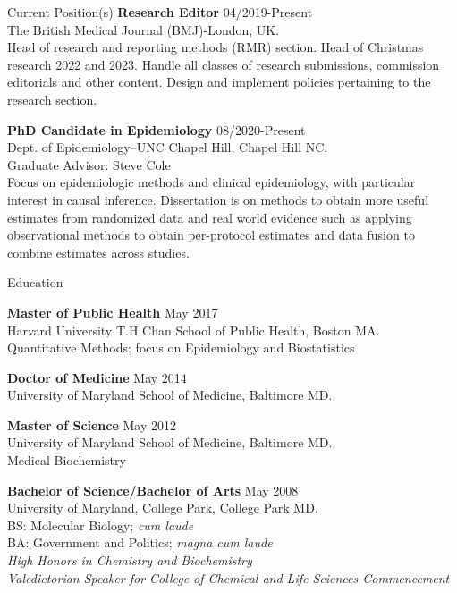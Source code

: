 \documentclass{resume} %
\begin{document}
\begin{rSection}{Current Position(s)}
   {\textbf{Research Editor} } \hfill {04/2019-Present}
   \\ 
   The British Medical Journal (BMJ)-London, UK. 
   \\
    Head of research and reporting methods (RMR) section. Head of Christmas research 2022 and 2023. Handle all classes of research submissions, commission editorials and other content. Design and implement policies pertaining to the research section. 
   
   {\textbf{PhD Candidate in Epidemiology}} \hfill {08/2020-Present}
   \\ 
   Dept. of Epidemiology--UNC Chapel Hill, Chapel Hill NC. 
   \\
   Graduate Advisor: Steve Cole\\
   Focus on epidemiologic methods and clinical epidemiology, with particular interest in causal inference. Dissertation is on methods to obtain more useful estimates from randomized data and real world evidence such as applying observational methods to obtain per-protocol estimates and data fusion to combine estimates across studies.
   
   \end{rSection}
   

\begin{rSection}{Education}

{\textbf{Master of Public Health}} \hfill {May 2017}
\\ 
Harvard University T.H Chan School of Public Health, Boston MA. 
\\
Quantitative Methods; focus on Epidemiology and Biostatistics  

{\textbf{Doctor of Medicine}} \hfill {May 2014}
\\ 
University of Maryland School of Medicine, Baltimore MD.

{\textbf{Master of Science}} \hfill {May 2012}
\\ 
University of Maryland School of Medicine, Baltimore MD.\\
Medical Biochemistry

{\textbf{Bachelor of Science/Bachelor of Arts}} \hfill {May 2008}
\\ 
University of Maryland, College Park, College Park MD.
\\
BS: Molecular Biology; \textit{cum laude}\\
BA: Government and Politics; \textit{magna cum laude}\\
\textit{High Honors in Chemistry and Biochemistry}\\
\textit{Valedictorian Speaker for College of Chemical and Life Sciences Commencement}

\end{rSection}
\end{document}

